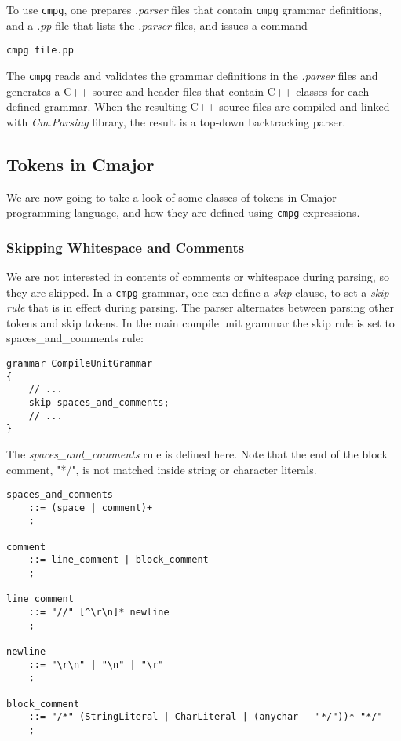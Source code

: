 \documentclass[a4paper,oneside,11pt]{book}
\theoremstyle{definition}
\begin{document}
To use \verb|cmpg|, one prepares \emph{.parser} files that contain \verb|cmpg| grammar definitions,
and a \emph{.pp} file that lists the \emph{.parser} files, and issues a command

\begin{verbatim}
cmpg file.pp
\end{verbatim}

The \verb|cmpg| reads and validates the grammar definitions in the \emph{.parser} files and
generates a C++ source and header files that contain C++ classes for each defined grammar.
When the resulting C++ source files are compiled and linked with \emph{Cm.Parsing} library,
the result is a top-down backtracking parser.

\clearpage
\subsection{Tokens in Cmajor}

We are now going to take a look of some classes of tokens in Cmajor programming language,
and how they are defined using \verb|cmpg| expressions.

\subsubsection{Skipping Whitespace and Comments}

We are not interested in contents of comments or whitespace during parsing, so they are skipped.
In a \verb|cmpg| grammar, one can define a \emph{skip} clause, to set a \emph{skip rule}
that is in effect during parsing. The parser alternates between parsing other tokens and skip tokens.
In the main compile unit grammar the skip rule is set to spaces_and_comments rule:

\begin{flushleft}
\begin{lstlisting}[language=cmpg,frame=trBL]
grammar CompileUnitGrammar
{
    // ...
    skip spaces_and_comments;
    // ...
}
\end{lstlisting}
\end{flushleft}

The \emph{spaces_and_comments} rule is defined here.
Note that the end of the block comment, "*/", is not matched
inside string or character literals.

\begin{flushleft}
\begin{lstlisting}[language=cmpg,frame=trBL]
spaces_and_comments
    ::= (space | comment)+
    ;

comment
    ::= line_comment | block_comment
    ;

line_comment
    ::= "//" [^\r\n]* newline
    ;

newline
    ::= "\r\n" | "\n" | "\r"
    ;

block_comment
    ::= "/*" (StringLiteral | CharLiteral | (anychar - "*/"))* "*/"
    ;
\end{lstlisting}
\end{flushleft}
\end{document}
